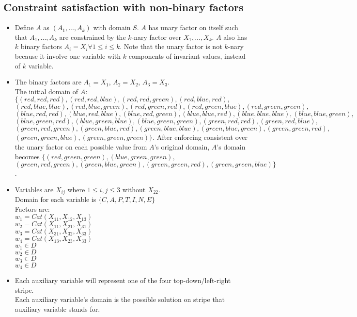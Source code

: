 \documentclass[11pt]{article}
\begin{document}
\begin{onehalfspace}
\section{Constraint satisfaction with non-binary factors}
\begin{itemize}
	\item
	Define $A$ as $(A_1,...,A_k)$ with domain $S$. $A$ has unary factor on itself such that $A_1,...,A_k$ are constrained by the $k$-nary factor over $X_1,...,X_k$. $A$ also has $k$ binary factors $A_i = X_i \forall 1 \leq i \leq k$. Note that the unary factor is not $k$-nary because it involve one variable with $k$ components of invariant values, instead of $k$ variable.\\
	\item
	 The binary factors are $A_1 = X_1$, $A_2 = X_2$, $A_3 = X_3$.\\
	 The initial domain of $A$: $\{(red,red,red),(red,red,blue),(red,red,green),(red,blue,red),$\\$(red,blue,blue),(red,blue,green),(red,green,red),(red,green,blue),(red,green,green),$\\$(blue,red,red),(blue,red,blue),(blue,red,green),(blue,blue,red),(blue,blue,blue),(blue,blue,green),$\\$(blue,green,red),(blue,green,blue),(blue,green,green),(green,red,red),(green,red,blue),$\\$(green,red,green),(green,blue,red),(green,blue,blue),(green,blue,green),(green,green,red),$\\$(green,green,blue),(green,green,green)\}$.
	 After enforcing consistent over the unary factor on each possible value from $A$'s original domain, $A$'s domain becomes $\{(red,green,green),(blue,green,green),$\\$(green,red,green),(green,blue,green),(green,green,red),(green,green,blue)\}$.
	 \item
	 Variables are $X_{ij}$ where $1 \leq i,j \leq 3$ without $X_{22}$.\\
	 Domain for each variable is $\{C,A,P,T,I,N,E\}$\\
	 Factors are:\\
	 $w_1 = Cat(X_{11},X_{12},X_{13})$\\
	 $w_2 = Cat(X_{11},X_{21},X_{31})$\\
	 $w_3 = Cat(X_{31},X_{32},X_{33})$\\
	 $w_4 = Cat(X_{13},X_{23},X_{33})$\\
	 $w_1 \in D$\\
	 $w_2 \in D$\\
	 $w_3 \in D$\\
	 $w_4 \in D$
	 \item
	 Each auxiliary variable will represent one of the four top-down/left-right stripe.\\
	 Each auxiliary variable's domain is the possible solution on stripe that auxiliary variable stands for.
\end{itemize}

\end{onehalfspace}
\end{document}
